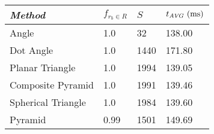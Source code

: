 
\begin{tabular}{m{}|m{}|m{}|m{}}
    \toprule
    \textit{Method} & $f_{r_b \in R}$ & $S$ & $t_{\AVG} \ (\si{ms})$  \\ \hline
    Angle & \num{1.0} & \num{32} & \num{138.00} \\ \hline
    Dot Angle & \num{1.0} & \num{1440} & \num{171.80} \\ \hline
    Planar \newline Triangle & \num{1.0} & \num{1994} & \num{139.05} \\ \hline
    Composite \newline Pyramid & \num{1.0} & \num{1991} & \num{139.46} \\ \hline
    Spherical \newline Triangle & \num{1.0} & \num{1984} & \num{139.60} \\ \hline
    Pyramid & \num{0.99} & \num{1501} & \num{149.69} \\ \bottomrule
\end{tabular}